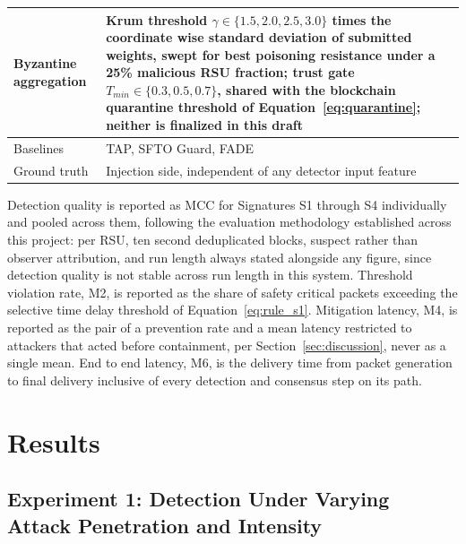 \documentclass[final,5p,twocolumn]{elsarticle}
\theoremstyle{remark}
\theoremstyle{plain}
\begin{document}
\begin{table}[!t]
\begin{tabular}{|>{\raggedright\arraybackslash}p{3.2cm}|>{\raggedright\arraybackslash}p{4.4cm}|}
		\hline
		Byzantine aggregation & Krum threshold $\gamma \in \{1.5, 2.0, 2.5, 3.0\}$ times the coordinate wise standard deviation of submitted weights, swept for best poisoning resistance under a 25\% malicious RSU fraction; trust gate $T_{min} \in \{0.3, 0.5, 0.7\}$, shared with the blockchain quarantine threshold of Equation~\eqref{eq:quarantine}; neither is finalized in this draft \\
		\hline
		Baselines & TAP, SFTO Guard, FADE \\
		\hline
		Ground truth & Injection side, independent of any detector input feature \\
		\hline
	\end{tabular}
\end{table}

Detection quality is reported as MCC for Signatures S1 through S4
individually and pooled across them, following the evaluation methodology
established across this project: per RSU, ten second deduplicated blocks,
suspect rather than observer attribution, and run length always stated
alongside any figure, since detection quality is not stable across run
length in this system. Threshold violation rate, M2, is reported as the
share of safety critical packets exceeding the selective time delay
threshold of Equation~\eqref{eq:rule_s1}. Mitigation latency, M4, is
reported as the pair of a prevention rate and a mean latency restricted to
attackers that acted before containment, per Section~\ref{sec:discussion},
never as a single mean. End to end latency, M6, is the delivery time from
packet generation to final delivery inclusive of every detection and
consensus step on its path.


\section{Results}
\label{sec:results}


\subsection{Experiment 1: Detection Under Varying Attack Penetration and Intensity}
\end{document}
